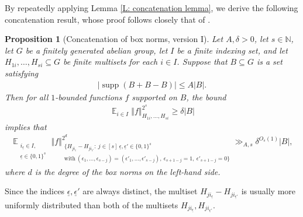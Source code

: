 \documentclass[11pt]{amsart}
\newtheorem{proposition}[lemma]{Proposition}
\theoremstyle{definition}
\DeclareMathOperator*{\E}{\mathbb{E}}
\newcommand{\N}{{\mathbb N}}
\newcommand{\ueps}{{\underline{\epsilon}}}
\DeclareMathOperator{\supp}{supp}
\newcommand{\norm}[1]{\left\Vert #1\right\Vert}
\begin{document}
By repeatedly applying Lemma \ref{L: concatenation lemma}, we derive the following concatenation result, whose proof follows closely that of \cite[Proposition 2.3]{Kuc23}.
\begin{proposition}[Concatenation of box norms, version I]\label{P: concatenation for general groups}
    Let $A, \delta>0$, let $s\in\N$,
    let $G$ be a finitely generated abelian group, let $I$ be a finite indexing set, and let $H_{1i}, \ldots, H_{si}\subseteq G$ be finite multisets for each $i\in I$.  Suppose that $B \subseteq G$ is a set
    satisfying 
    \begin{align*}
        |\supp(B+B-B)|\leq A|B|.
    \end{align*}
    Then for all $1$-bounded functions $f$ supported on $B$, the bound
    \begin{align}\label{E: concatenation V1 lower bound}
        {\E_{i\in I}\norm{f}_{H_{1i}, \ldots, H_{si}}^{2^{s}}}\geq \delta |B|
    \end{align}
    implies that
    \begin{align*}
        \E_{\substack{i_\ueps\in I,\\ \ueps\in\{0,1\}^s}}\norm{f}_{\substack{\{H_{j i_\ueps}-H_{j i_{\ueps'}}:\ j\in[s]\ \ueps,\ueps'\in\{0,1\}^s\\ \mathrm{with}\ (\epsilon_1, \ldots,  \epsilon_{s-j}) = (\epsilon'_1, \ldots,  \epsilon'_{s-j}),\ \epsilon_{s+1-j}=1,\ \epsilon'_{s+1-j} = 0\}}}^{2^d} \gg_{A, s} \delta^{O_s(1)}|B|,
    \end{align*}
    where $d$ is the degree of the box norms on the left-hand side.
\end{proposition}
Since the indices $\ueps,\ueps'$ are always distinct, the multiset $H_{j i_\ueps} - H_{j i_{\ueps'}}$ is usually more uniformly distributed than both of the multisets $H_{j i_\ueps}, H_{j i_{\ueps'}}$.
\end{document}
